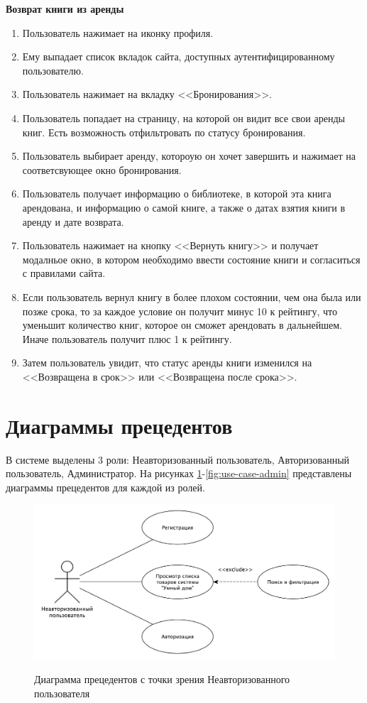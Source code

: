 \textbf{Возврат книги из аренды}
\begin{enumerate}
	\item Пользователь нажимает на иконку профиля.
	\item Ему выпадает список вкладок сайта, доступных аутентифицированному пользователю.
  \item Пользователь нажимает на вкладку <<Бронирования>>.
	\item Пользователь попадает на страницу, на которой он видит все свои аренды книг. Есть возможность отфильтровать по статусу бронирования.
	\item Пользователь выбирает аренду, котороую он хочет завершить и нажимает на соответсвующее окно бронирования.
	\item Пользователь получает информацию о библиотеке, в которой эта книга арендована, и информацию о самой книге, а также о датах взятия книги в аренду и дате возврата.
  \item Пользователь нажимает на кнопку <<Вернуть книгу>> и получает модалньое окно, в котором необходимо ввести состояние книги и согласиться с правилами сайта.
  \item Если пользователь вернул книгу в более плохом состоянии, чем она была или позже срока, то за каждое условие он получит минус 10 к рейтингу, что уменьшит количество книг, которое он сможет арендовать в дальнейшем. Иначе пользователь получит плюс 1 к рейтингу.
  \item Затем пользователь увидит, что статус аренды книги изменился на <<Возвращена в срок>> или <<Возвращена после срока>>.
\end{enumerate}


\section{Диаграммы прецедентов}
В системе выделены 3 роли: Неавторизованный пользователь, Авторизованный пользователь, Администратор. На рисунках \ref{fig:use-case-non-auth}-\ref{fig:use-case-admin} представлены диаграммы прецедентов для каждой из ролей.

\begin{figure}[H]
	\begin{center}
		{\includegraphics[scale = 0.5]{../img/use-case/non-auth-user.pdf}}
		\caption{Диаграмма прецедентов с точки зрения Неавторизованного пользователя}
		\label{fig:use-case-non-auth}
	\end{center}
\end{figure}

